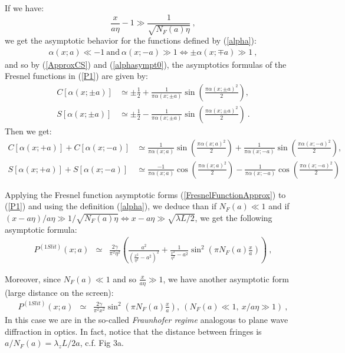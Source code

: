 \documentclass[12pt]{article}   %
\begin{document}
{
If we have: $$\frac{x}{a\eta}-1\gg \frac{1}{\sqrt{N_F(a)\eta}}\ ,$$ 
we get the asymptotic behavior for the functions defined by (\ref{alpha}):
\begin{eqnarray}\label{alphasympt0}
\alpha(x;a)\ll-1\ \mathrm{and}\ \alpha(x;-a)\gg1 \Leftrightarrow \pm\alpha(x;\mp a)\gg1\ ,
\end{eqnarray}
and so by (\ref{ApproxCS}) and (\ref{alphasympt0}),
the asymptotics formulas of the Fresnel functions in (\ref{P1}) are given by:
\begin{align}\label{CSasympt1}
C[\alpha(x;\pm a)] &\simeq \pm\frac{1}{2} + \frac{1}{\pi\alpha(x;\pm a)}\sin{(\frac{\pi\alpha(x;\pm a)^2}{2})},
{}\nonumber\\{} S[\alpha(x;\pm a)] &\simeq \pm\frac{1}{2} - \frac{1}{\pi\alpha(x;\pm a)}\sin{(\frac{\pi\alpha(x;\pm a)^2}{2})}\ .
\end{align}}
{Then we get:
\begin{align}\label{FresnelFunctionApprox}
 C[\alpha(x;+a)]+C[\alpha(x;-a)] &\simeq \frac{1}{\pi\alpha(x;a)}\sin{(\frac{\pi\alpha(x;a)^2}{2})}
+\frac{1}{\pi\alpha(x;-a)}\sin{(\frac{\pi\alpha(x;-a)^2}{2})},
{}\nonumber\\{} S[\alpha(x;+a)]+S[\alpha(x;-a)] &\simeq \frac{-1}{\pi\alpha(x;a)}\cos{(\frac{\pi\alpha(x;a)^2}{2})}
-\frac{1}{\pi\alpha(x;-a)}\cos{(\frac{\pi\alpha(x;-a)^2}{2})}
\end{align}}


Applying the Fresnel function asymptotic forms (\ref{FresnelFunctionApprox}) to
(\ref{P1}) and using the definition (\ref{alpha}), we deduce than if $N_F(a)\ll 1$ and
if $(x-a\eta)/a\eta\gg 1/\sqrt{N_F(a)\eta}\Leftrightarrow
x-a\eta\gg\sqrt{\lambda L/2}$, we get the following asymptotic
formula:
\begin{eqnarray}\label{P1ApproxNFsmall0}
P^{(1 Slit)}(x;a)&\simeq&\frac{2\gamma}{\pi^2\eta^2}
\left(\frac{a^2}{(\frac{x^2}{\eta^2}-a^2)^2} +
\frac{1}{\frac{x^2}{\eta^2}-a^2}\sin^2{(\pi N_F(a)
\frac{x}{a})}\right) \ ,
\end{eqnarray}


Moreover, since $N_F(a)\ll1$ and so $\frac{x}{a\eta}\gg1$, we have another asymptotic form
(large distance on the screen):
\begin{eqnarray}\label{P1ApproxNFsmall}
P^{(1 Slit)}(x;a)&\simeq&\frac{2\gamma}{\pi^2 x^2} \sin^2{(\pi
N_F(a) \frac{x}{a})},\ (N_F(a)\ll1,\ x/a\eta\gg 1)\ ,
\end{eqnarray}
In this case we are in the so-called \textit{Fraunhofer regime}
analogous to plane wave diffraction in optics.\cite{Optics} In
fact, notice that the distance between fringes is
$a/N_F(a)=\lambda_z L/2a$, c.f. Fig 3a.
\end{document}
